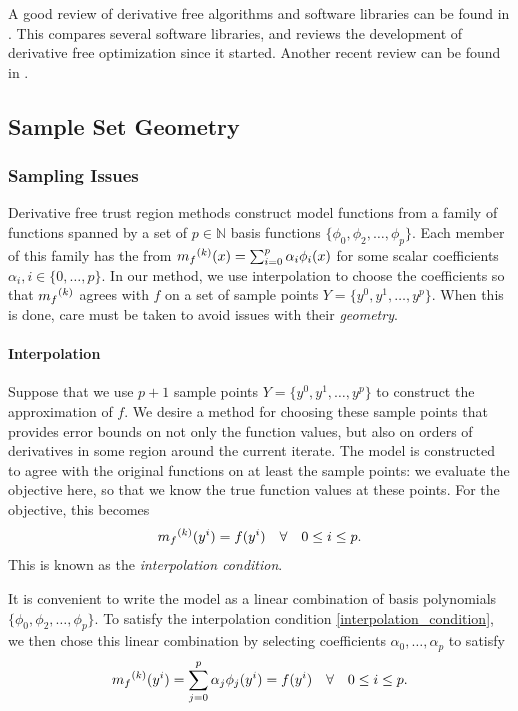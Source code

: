 A good review of derivative free algorithms and software libraries can be found in \cite{DUMMY:review}.
This compares several software libraries, and reviews the development of derivative free optimization since it started.
Another recent review can be found in \cite{DUMMY:review2}.



\subsection{Sample Set Geometry}

\subsubsection{Sampling Issues}

Derivative free trust region methods construct model functions from a family of functions spanned by a set of $p \in \mathbb N$ basis functions 
$\{\phi_0, \phi_2, \ldots, \phi_p\}$.
Each member of this family has the from ${{m}_f}^{(k)}(x) = \sum_{i=0}^p\alpha_i\phi_i(x)$ for some scalar coefficients $\alpha_i, i \in \{0, \ldots, p\}$.
In our method, we use interpolation to choose the coefficients so that ${{m}_f}^{(k)}$ agrees with $f$ on a set of sample points $Y = \{y^0, y^1, \ldots, y^p\}$.
When this is done, care must be taken to avoid issues with their \emph{geometry}.

\paragraph{Interpolation}
\label{interpolation}
Suppose that we use $p+1$ sample points $Y = \{y^0, y^1, \ldots, y^p\}$ to construct the approximation of $f$.
We desire a method for choosing these sample points that provides error bounds on not only the function values, but also on orders of derivatives in some region around the current iterate.
The model is constructed to agree with the original functions on at least the sample points: we evaluate the objective here, so that we know the true function values at these points.
For the objective, this becomes
\begin{align}
\label{interpolation_condition}
{{m}_f}^{(k)}(y^i) = f(y^i) \quad \forall \quad 0 \le i \le p.
\end{align}
This is known as the \emph{interpolation condition}.

It is convenient to write the model as a linear combination of basis polynomials $\{\phi_0, \phi_2, \ldots, \phi_p\}$.
To satisfy the interpolation condition \cref{interpolation_condition}, we then chose this linear combination by selecting coefficients $\alpha_0, \ldots, \alpha_p$ to satisfy
\begin{align}
\label{interpolation_formula}
    {{m}_f}^{(k)}(y^i) = \sum^p_{j=0}\alpha_j\phi_j(y^i) = f(y^i) \quad \forall \quad 0 \le i \le p.
\end{align}

